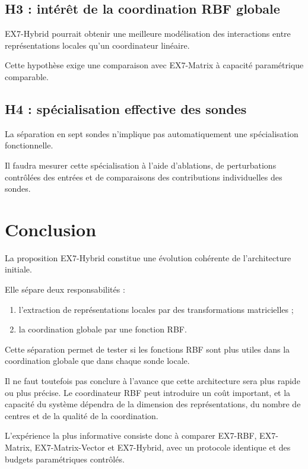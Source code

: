 \documentclass[11pt,a4paper]{article}
\begin{document}
\subsection*{H3 : intérêt de la coordination RBF globale}

EX7-Hybrid pourrait obtenir une meilleure modélisation
des interactions entre représentations locales qu'un
coordinateur linéaire.

Cette hypothèse exige une comparaison avec EX7-Matrix
à capacité paramétrique comparable.

\subsection*{H4 : spécialisation effective des sondes}

La séparation en sept sondes n'implique pas automatiquement
une spécialisation fonctionnelle.

Il faudra mesurer cette spécialisation à l'aide d'ablations,
de perturbations contrôlées des entrées et de comparaisons
des contributions individuelles des sondes.

\section{Conclusion}

La proposition EX7-Hybrid constitue une évolution cohérente
de l'architecture initiale.

Elle sépare deux responsabilités :

\begin{enumerate}
  \item l'extraction de représentations locales par des
  transformations matricielles ;
  \item la coordination globale par une fonction RBF.
\end{enumerate}

Cette séparation permet de tester si les fonctions RBF sont
plus utiles dans la coordination globale que dans chaque
sonde locale.

Il ne faut toutefois pas conclure à l'avance que cette
architecture sera plus rapide ou plus précise. Le coordinateur
RBF peut introduire un coût important, et la capacité du
système dépendra de la dimension des représentations,
du nombre de centres et de la qualité de la coordination.

L'expérience la plus informative consiste donc à comparer
EX7-RBF, EX7-Matrix, EX7-Matrix-Vector et EX7-Hybrid,
avec un protocole identique et des budgets paramétriques
contrôlés.
\end{document}
